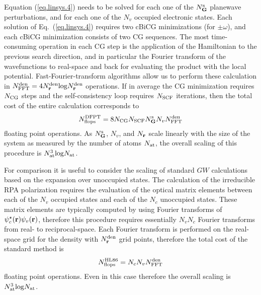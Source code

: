 \documentclass[twocolumn,prb,showpacs,superscriptaddress]{revtex4}
\def\w{\omega}
\def\G{{\bf G}}
\def\r{{\bf r}}
\begin{document}
Equation (\ref{eq.linsys.4}) needs to be solved for each one of the $N_\G^{\rm s}$ planewave perturbations,
and for each one of the $N_v$ occupied electronic states.
Each solution of Eq.\ (\ref{eq.linsys.4}) requires two cBiCG minimizations
(for $\pm\w$), and each cBiCG minimization consists of two CG sequences.
The most time-consuming operation in each CG step is the application of the Hamiltonian 
to the previous search direction, and in particular
the Fourier transform of the wavefunctions to real-space and back for evaluating
the product with the local potential. Fast-Fourier-transform
algorithms allow us to perform these calculation in $N^{\rm den}_{\rm FFT} = 4 N_\r^{\rm den} {\rm log} N_\r^{\rm den}$ operations.\cite{frigo}
If in average the CG minimization requires $N_{\rm CG}$ steps
and the self-consistency loop requires $N_{\rm SCF}$ iterations,
then the total cost of the entire calculation corresponds to
   \begin{equation}\label{eq.scaling.1}
   N^{\rm DFPT}_{\rm flops} = 8 N_{\rm CG} N_{\rm SCF} N_\G^{\rm s}  N_v N^{\rm den}_{\rm FFT}
   \end{equation}
floating point operations.
As $N_\G^{\rm s}$, $N_v$, and $N_\r$ scale linearly with the size of the system
as measured by the number of atoms $N_{\rm at}$,
the overall scaling of this procedure is $N_{\rm at}^3 {\rm log} N_{\rm at}$.

For comparison it is useful to consider the scaling of standard $GW$ calculations
based on the expansion over unoccupied states.\cite{hl86} 
The calculation of the irreducible RPA polarization requires the evaluation of the 
optical matrix elements between each of the $N_v$ occupied states and each of the $N_c$ unoccupied states.
These matrix elements are typically computed by using Fourier transforms of $\psi_c^\star(\r)\psi_v(\r)$,
therefore this procedure requires essentially $N_v N_c$ Fourier transforms from real- to reciprocal-space.
Each Fourier transform is performed on the real-space grid for the density with $N_\r^{\rm den}$ grid points, 
therefore the total cost of the standard method is
   \begin{equation}\label{eq.scaling.2}
   N^{\rm HL86}_{\rm flops} = N_c  N_v N^{\rm den}_{\rm FFT}
   \end{equation}
floating point operations.
Even in this case therefore the overall scaling is $N_{\rm at}^3 {\rm log} N_{\rm at}$.
\end{document}
